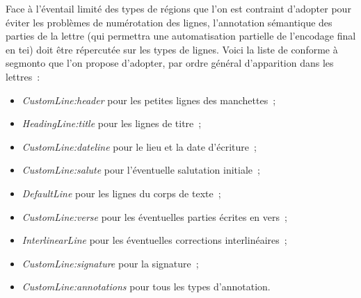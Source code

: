 \documentclass[a4paper,12pt,twoside]{book}
\begin{document}
				Face à l'éventail limité des types de régions que l'on est contraint d'adopter pour éviter les problèmes de numérotation des lignes, l'annotation sémantique des parties de la lettre (qui permettra une automatisation partielle de l'encodage final en \gls{tei}) doit être répercutée sur les types de lignes. Voici la liste de conforme à \gls{segmonto} que l'on propose d'adopter, par ordre général d'apparition dans les lettres~:
				
				\begin{itemize}
					\item \textit{CustomLine:header} pour les petites lignes des manchettes~;
					\item \textit{HeadingLine:title} pour les lignes de titre~;
					\item \textit{CustomLine:dateline} pour le lieu et la date d'écriture~;
					\item \textit{CustomLine:salute} pour l'éventuelle salutation initiale~;
					\item \textit{DefaultLine} pour les lignes du corps de texte~;
					\item \textit{CustomLine:verse} pour les éventuelles parties écrites en vers~;
					\item \textit{InterlinearLine} pour les éventuelles corrections interlinéaires~;\label{interlinear}
					\item \textit{CustomLine:signature} pour la signature~;
					\item \textit{CustomLine:annotations} pour tous les types d'annotation.
				\end{itemize}
		
\end{document}
